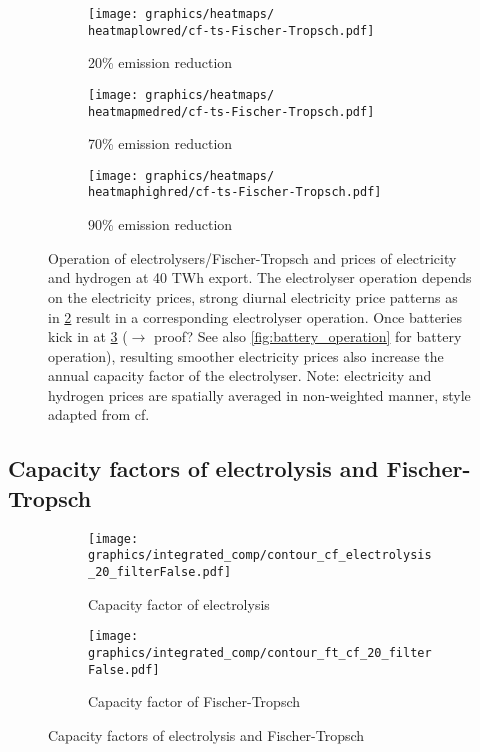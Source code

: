\begin{figure}[h]
\begin{subfigure}[h]{0.33\textwidth}
    \end{subfigure}


    \begin{subfigure}[h]{0.33\textwidth}
        \centering
        \texttt{[image: graphics/heatmaps/\\heatmaplowred/cf-ts-Fischer-Tropsch.pdf]}
        \caption{20\% emission reduction}
        \label{fig:operation20}
    \end{subfigure}
    \begin{subfigure}[h]{0.33\textwidth}
        \centering
        \texttt{[image: graphics/heatmaps/\\heatmapmedred/cf-ts-Fischer-Tropsch.pdf]}
        \caption{70\% emission reduction}
        \label{fig:operation70}
    \end{subfigure}
    \begin{subfigure}[h]{0.33\textwidth}
        \centering
        \texttt{[image: graphics/heatmaps/\\heatmaphighred/cf-ts-Fischer-Tropsch.pdf]}
        \caption{90\% emission reduction}
        \label{fig:operation90}
    \end{subfigure}

    \caption{Operation of electrolysers/Fischer-Tropsch and prices of electricity and hydrogen at 40 TWh export. The electrolyser operation depends on the electricity prices, strong diurnal electricity price patterns as in \ref{fig:operation70} result in a corresponding electrolyser operation. Once batteries kick in at \ref{fig:operation90} ($\rightarrow$ proof? See also \ref{fig:battery_operation} for battery operation), resulting smoother electricity prices also increase the annual capacity factor of the electrolyser. Note: electricity and hydrogen prices are spatially averaged in non-weighted manner, style adapted from cf. \cite{Neumann2022}}
    \label{fig:operation-ely-ft}
\end{figure}



\subsection{Capacity factors of electrolysis and Fischer-Tropsch}

\begin{figure*}[h] %
    \centering
    \begin{subfigure}[b]{0.49\linewidth}
        \centering
        \texttt{[image: graphics/integrated\_comp/contour\_cf\_electrolysis\_20\_filterFalse.pdf]}
        \caption{Capacity factor of electrolysis}
        \label{fig:cf-ely}
    \end{subfigure}
    \hfill
    \begin{subfigure}[b]{0.49\linewidth}
        \centering
        \texttt{[image: graphics/integrated\_comp/contour\_ft\_cf\_20\_filterFalse.pdf]}
        \caption{Capacity factor of Fischer-Tropsch}
        \label{fig:cf-ft}
    \end{subfigure}
    \hfill
    \caption{Capacity factors of electrolysis and Fischer-Tropsch}
    \label{fig:cf-ely-ft}
\end{figure*}



\clearpage